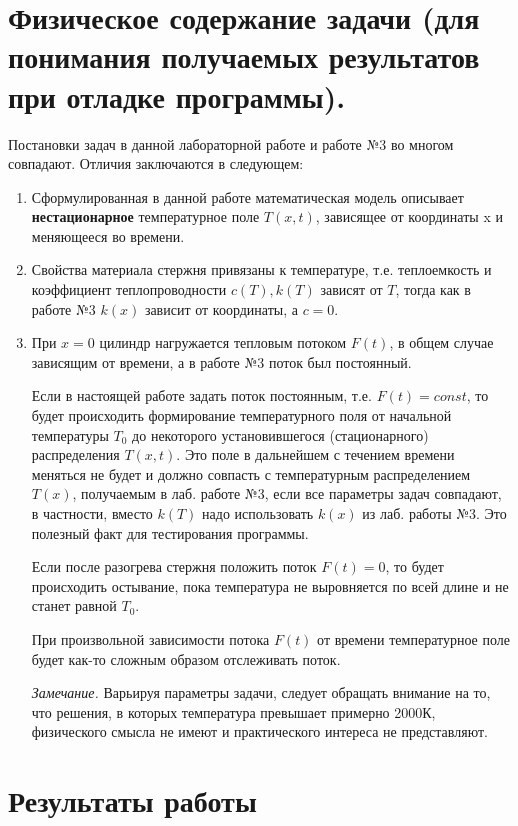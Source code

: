 \documentclass[a4paper,12pt]{article}
\begin{document}
	\section*{Физическое содержание задачи (для понимания получаемых результатов при отладке программы).}
	
	Постановки задач в данной лабораторной  работе и работе №3 во многом совпадают. Отличия заключаются в следующем:
	
	\begin{enumerate}
		\item Сформулированная в данной работе  математическая модель описывает {\bf нестационарное} температурное поле  $T(x, t)$, зависящее от координаты x и меняющееся во времени.
		\item Свойства материала стержня привязаны к температуре, т.е. теплоемкость и коэффициент теплопроводности $c(T), k(T)$ зависят от $T$, тогда как в работе №3 $k(x)$ зависит от координаты, а $c = 0$.  
		\item При $x = 0$ цилиндр нагружается тепловым потоком $F(t)$, в общем случае зависящим от времени, а в работе №3 поток был постоянный.
		
		Если в настоящей работе задать  поток постоянным, т.е. $F(t) = const$, то  будет происходить формирование температурного поля от начальной температуры $T_0$ до некоторого установившегося (стационарного) распределения $T(x, t)$. Это поле в дальнейшем с течением времени меняться не будет и должно совпасть с температурным распределением $T(x)$, получаемым в лаб. работе №3, если все параметры задач совпадают, в частности, вместо $k(T)$ надо использовать $k(x)$ из лаб. работы №3. Это полезный факт для тестирования программы.
		
		Если после разогрева стержня положить поток  $F(t) = 0$, то будет происходить остывание, пока температура не выровняется по всей длине и не станет равной $T_0$.
		
		При произвольной зависимости потока $F(t)$ от времени температурное поле будет как-то сложным образом отслеживать поток.
		
		\textit{Замечание.} Варьируя параметры задачи, следует обращать внимание на то, что решения, в которых температура превышает примерно 2000К, физического смысла не имеют и практического интереса не представляют.
	\end{enumerate}

	\section*{Результаты работы}
	
\end{document}

